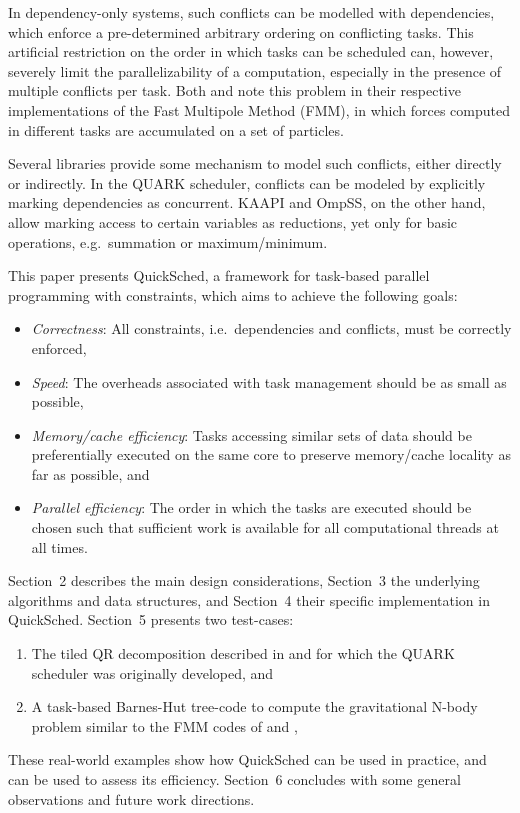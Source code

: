 \documentclass[fleqn,10pt]{wlpeerj}
\begin{document}
In dependency-only systems, such conflicts can be modelled
with dependencies, which enforce a pre-determined arbitrary
ordering on conflicting tasks.
This artificial restriction on the order
in which tasks can be scheduled can, however, severely limit the
parallelizability of a computation, especially in the presence
of multiple conflicts per task.
Both \cite{ref:Ltaief2012} and \cite{ref:Agullo2013} note
this problem in their respective implementations of the Fast Multipole
Method (FMM), in which forces computed in different tasks are
accumulated on a set of particles.

Several libraries provide some mechanism to model such
conflicts, either directly or indirectly.
In the QUARK scheduler, conflicts can be modeled by explicitly
marking dependencies as concurrent.
KAAPI and OmpSS, on the other hand, allow marking access to
certain variables as reductions, yet only for basic operations,
e.g.~summation or maximum/minimum.

This paper presents QuickSched, a framework for task-based
parallel programming with constraints, which aims to achieve
the following goals:
\begin{itemize}
    \item {\em Correctness}: All constraints, i.e.~dependencies and
        conflicts, must be correctly enforced,
    \item {\em Speed}: The overheads associated with task management
        should be as small as possible,
    \item {\em Memory/cache efficiency}: Tasks accessing similar
        sets of data should be preferentially executed on the
        same core to preserve memory/cache locality as far as possible, and
    \item {\em Parallel efficiency}: The order in which the tasks
        are executed should be chosen such
        that sufficient work is available for all computational
        threads at all times.
\end{itemize}
\noindent 
Section~2 describes the main design considerations, Section~3 the
underlying algorithms and data structures, and
Section~4 their specific implementation in QuickSched.
Section~5 presents two test-cases:
\begin{enumerate}
    \item The tiled QR
    decomposition described in \cite{ref:Buttari2009} and for
    which the QUARK scheduler was originally developed, and
    \item A task-based Barnes-Hut tree-code to compute the
    gravitational N-body problem similar to the FMM codes
    of \cite{ref:Ltaief2012} and \cite{ref:Agullo2013},
\end{enumerate}
These real-world examples show how QuickSched can be used in practice,
and can be used to assess its efficiency.
Section~6 concludes with some general observations and future work
directions.
\end{document}
